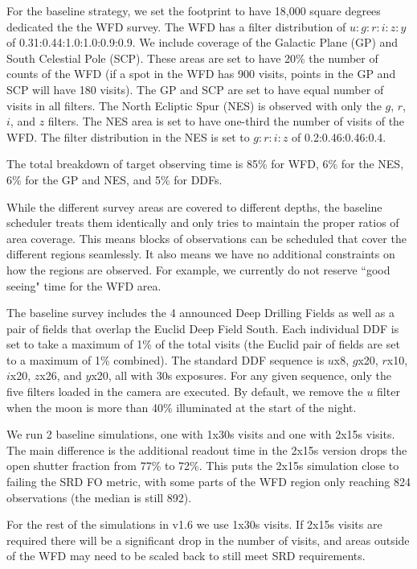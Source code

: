 For the baseline strategy, we set the footprint to have 18,000 square degrees dedicated the the WFD survey. The WFD has a filter distribution of $u:g:r:i:z:y$ of 0.31:0.44:1.0:1.0:0.9:0.9. 
We include coverage of the Galactic Plane (GP) and South Celestial Pole (SCP). These areas are set to have 20\% the number of counts of the WFD (if a spot in the WFD has 900 visits, points in the GP and SCP will have 180 visits). The GP and SCP are set to have equal number of visits in all filters.  The North Ecliptic Spur (NES) is observed with only the $g$, $r$, $i$, and $z$ filters. The NES area is set to have one-third the number of visits of the WFD.  The filter distribution in the NES is set to $g:r:i:z$ of 0.2:0.46:0.46:0.4. 

The total breakdown of target observing time is 85\% for WFD, 6\% for the NES, 6\% for the GP and NES, and 5\% for DDFs.


While the different survey areas are covered to different depths, the baseline scheduler treats them identically and only tries to maintain the proper ratios of area coverage. This means blocks of observations can be scheduled that cover the different regions seamlessly. It also means we have no additional constraints on how the regions are observed. For example, we currently do not reserve ``good seeing" time for the WFD area. 

The baseline survey includes the 4 announced Deep Drilling Fields as well as a pair of fields that overlap the Euclid Deep Field South.  Each individual DDF is set to take a maximum of 1\% of the total visits (the Euclid pair of fields are set to a maximum of 1\% combined). The standard DDF sequence is $u$x8, $g$x20, $r$x10, $i$x20, $z$x26, and $y$x20, all with 30s exposures. For any given sequence, only the five filters loaded in the camera are executed. By default, we remove the $u$ filter when the moon is more than 40\% illuminated at the start of the night. 


We run 2 baseline simulations, one with 1x30s visits and one with 2x15s visits.  The main difference is the additional readout time in the 2x15s version drops the open shutter fraction from 77\% to 72\%. This puts the 2x15s simulation close to failing the SRD FO metric, with some parts of the WFD region only reaching 824 observations (the median is still 892). 

For the rest of the simulations in v1.6 we use 1x30s visits.  If 2x15s visits are required there will be a significant drop in the number of visits, and areas outside of the WFD may need to be scaled back to still meet SRD requirements.

